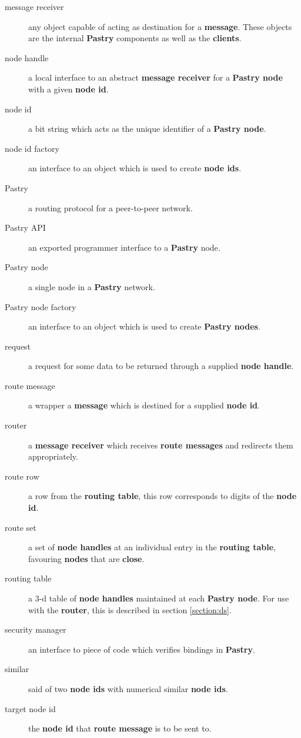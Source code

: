 \documentclass{article}
\begin{document}
\begin{description}
\item [message receiver] any object capable of acting as destination
  for a {\bf message}.  These objects are the internal {\bf Pastry}
  components as well as the {\bf clients}.

\item [node handle] a local interface to an abstract {\bf message receiver} for a {\bf
  Pastry node} with a given {\bf node id}.

\item [node id] a bit string which acts as the unique identifier of a
  {\bf Pastry node}.

\item [node id factory] an interface to an object which is used to
  create {\bf node ids}.

\item [Pastry] a routing protocol for a peer-to-peer network.

\item [Pastry API] an exported programmer interface to a {\bf Pastry} node.

\item [Pastry node] a single node in a {\bf Pastry} network.

\item [Pastry node factory] an interface to an object which is used to create {\bf
  Pastry nodes}.

\item [request] a request for some data to be returned through a
  supplied {\bf node handle}.

\item [route message] a wrapper a {\bf message} which is destined for
  a supplied {\bf node id}.

\item [router] a {\bf message receiver} which receives {\bf route
  messages} and redirects them appropriately.

\item [route row] a row from the {\bf routing table}, this row
  corresponds to digits of the {\bf node id}.

\item [route set] a set of {\bf node handles} at an individual entry
  in the {\bf routing table}, favouring {\bf nodes} that are {\bf close}.

\item [routing table] a $3$-d table of {\bf node handles} maintained
  at each {\bf Pastry node}. For use with the {\bf router}, this is described in
  section \ref{section:ds}.

\item [security manager] an interface to piece of code which verifies
  bindings in {\bf Pastry}.

\item [similar] said of two {\bf node ids} with numerical similar {\bf
  node ids}.

\item [target node id] the {\bf node id} that {\bf route message} is
  to be sent to.

\end{description}
\end{document}
